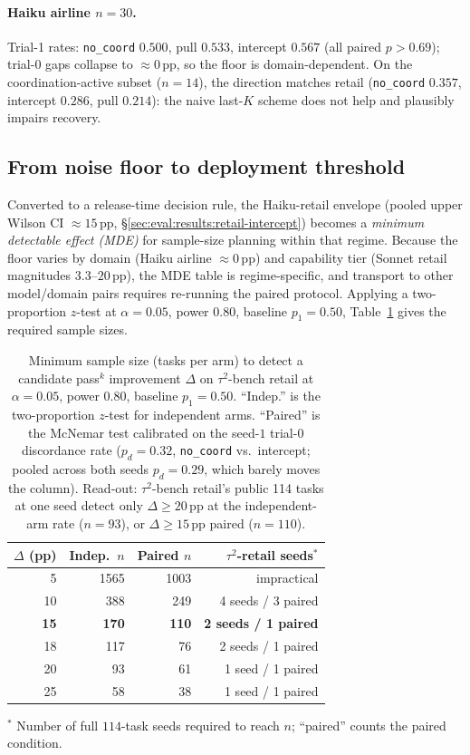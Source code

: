 \paragraph{Haiku airline $n{=}30$.}
Trial-1 rates: \texttt{no\_coord} $0.500$, pull $0.533$,
intercept $0.567$ (all paired $p{>}0.69$); trial-0 gaps collapse
to $\approx 0$\,pp, so the floor is domain-dependent. On the
coordination-active subset ($n{=}14$), the direction matches
retail (\texttt{no\_coord} $0.357$, intercept $0.286$, pull
$0.214$): the naive last-$K$ scheme does not help and plausibly
impairs recovery.

\subsection{From noise floor to deployment threshold}
\label{sec:eval:deployment}

Converted to a release-time decision rule, the Haiku-retail
envelope (pooled upper Wilson CI ${\approx}15$\,pp,
\S\ref{sec:eval:results:retail-intercept}) becomes a
\emph{minimum detectable effect (MDE)} for sample-size planning
within that regime. Because the floor varies by domain (Haiku
airline $\approx 0$\,pp) and capability tier (Sonnet retail
magnitudes $3.3$--$20$\,pp), the MDE table is regime-specific, and transport
to other model/domain pairs requires re-running the paired
protocol. Applying a two-proportion $z$-test at $\alpha{=}0.05$,
power $0.80$, baseline $p_1{=}0.50$, Table~\ref{tab:mde} gives
the required sample sizes.

\begin{table}[t]
\centering
\caption{Minimum sample size (tasks per arm) to detect a
candidate pass$^k$ improvement $\Delta$ on $\tau^2$-bench retail
at $\alpha{=}0.05$, power $0.80$, baseline $p_1{=}0.50$.
``Indep.'' is the two-proportion $z$-test for independent arms.
``Paired'' is the McNemar test calibrated on the seed-$1$
trial-0 discordance rate ($p_d{=}0.32$, \texttt{no\_coord} vs.\
intercept; pooled across both seeds $p_d{=}0.29$, which barely
moves the column).  Read-out: $\tau^2$-bench retail's public
114 tasks at one seed detect only $\Delta{\geq}20$\,pp at the
independent-arm rate ($n{=}93$), or $\Delta{\geq}15$\,pp
paired ($n{=}110$).}
\label{tab:mde}
\small
\begin{tabular}{rrrr}
\toprule
$\Delta$ (pp) & Indep.\ $n$ & Paired $n$ & $\tau^2$-retail seeds$^\ast$ \\
\midrule
5  & 1565 & 1003 & impractical \\
10 & 388  & 249  & 4 seeds / 3 paired \\
\textbf{15} & \textbf{170}  & \textbf{110}  & \textbf{2 seeds / 1 paired} \\
18 & 117  & 76   & 2 seeds / 1 paired \\
20 & 93   & 61   & 1 seed / 1 paired \\
25 & 58   & 38   & 1 seed / 1 paired \\
\bottomrule
\end{tabular}
\flushleft\footnotesize
$^\ast$ Number of full $114$-task seeds required to reach $n$;
``paired'' counts the paired condition.
\end{table}

